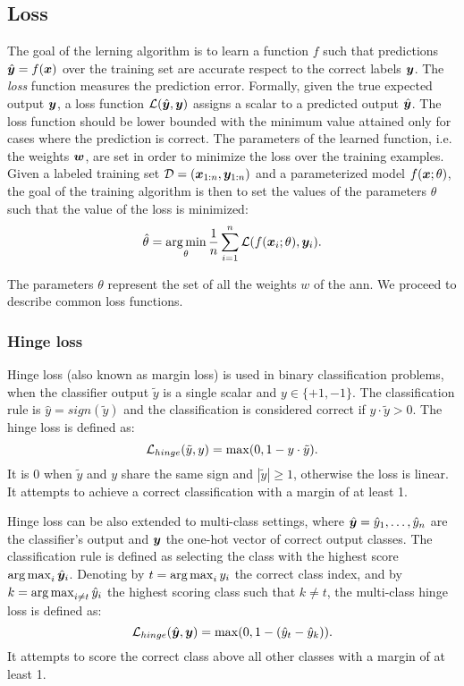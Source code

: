\subsection{Loss}
The goal of the lerning algorithm is to learn a function $f$ such that
predictions $\hat{\bm{y}}=f(\bm{x})$ over the training set are accurate respect
to the correct labels $\bm{y}$. The \emph{loss} function measures
the prediction error. Formally, given the true expected output
$\bm{y}$, a loss function
$\mathcal{L}(\hat{\bm{y}},\bm{y})$ assigns a scalar to a predicted
output $\hat{\bm{y}}$. The loss function should be lower bounded with the
minimum value attained only for cases where the prediction is correct. The
parameters of the learned function, i.e. the weights $\bm{w}$, are
set in order to minimize the loss over the training examples. Given a
labeled training set $\mathcal{D}=(\bm{x}_{1:n},\bm{y}_{1:n})$ and a
parameterized model $f(\bm{x};\theta)$, the goal of the training
algorithm is then to set the values of the parameters $\theta$
such that the value of the loss is minimized:
\begin{equation}\label{eq:lossmin}
  \hat\theta=\operatorname*{arg\,min}_\theta\frac{1}{n}\sum_{i=1}^n\mathcal{L}(f(\bm{x}_i;\theta),\bm{y}_i).
\end{equation}

The parameters $\theta$ represent the set of all the weights $w$ of
the \ac{ann}. 
We proceed to describe common loss functions.

\subsubsection{Hinge loss}
Hinge loss (also known as margin loss) is used in binary classification
problems, when the classifier output $\tilde{y}$ is a single scalar and
$y\in\{+1,-1\}$. The classification rule is $\hat{y}=sign(\tilde{y})$
and the classification is considered correct if
$y\cdot\tilde{y}>0$. The hinge loss is defined as:
\begin{equation*}
  \mathcal{L}_{hinge}(\tilde{y},y)=\max(0,1-y\cdot\tilde{y}).
\end{equation*}
It is $0$ when $\tilde{y}$ and $y$ share the same sign and
$|\tilde{y}|\geq 1$, otherwise the loss is linear. It attempts to
achieve a correct classification with a margin of at least 1.

Hinge loss can be also extended to multi-class settings, where
$\hat{\bm{y}}=\hat{y}_1,\dots,\hat{y}_n$ are the classifier's
output and $\bm{y}$ the one-hot vector of correct output
classes. The classification rule is defined as selecting the class
with the highest score $\operatorname*{arg\,max}_i\hat{\bm{y}}_i$. Denoting by
$t=\operatorname*{arg\,max}_iy_i$ the correct class index, and by $k=\operatorname*{arg\,max}_{i\neq
  t}\hat{y}_i$ the highest scoring class such that $k\neq t$, the
multi-class hinge loss is defined as:
\begin{equation*}
  \mathcal{L}_{hinge}(\hat{\bm{y}},
  \bm{y})=\max(0,1-(\hat{y}_t-\hat{y}_k)).
\end{equation*}
It attempts to score the correct class above all other classes with a
margin of at least 1.

